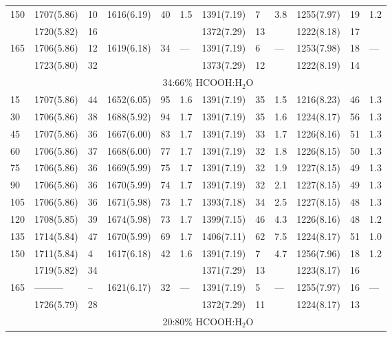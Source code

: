 \documentclass{aa}
\begin{document}
\begin{appendix}
\begin{table*}
\begin{center}
\begin{tabular}{l|lllll|lll|lll}
150          & 1707(5.86) & 10 & 1616(6.19) & 40 & 1.5 & 1391(7.19) &  7 & 3.8 & 1255(7.97) & 19 & 1.2\\ 
             & 1720(5.82) & 16 &            &    &     & 1372(7.29) & 13 &     & 1222(8.18) & 17 &    \\ 
165          & 1706(5.86) & 12 & 1619(6.18) & 34 & --- & 1391(7.19) &  6 & --- & 1253(7.98) & 18 & ---\\
             & 1723(5.80) & 32 &            &    &     & 1373(7.29) & 12 &     & 1222(8.19) & 14 &    \\ 
\hline
 & \multicolumn{11}{c}{34:66\% HCOOH:H$_2$O}\\
\hline
15           & 1707(5.86) & 44 & 1652(6.05) & 95 & 1.6 & 1391(7.19) & 35 & 1.5 & 1216(8.23) & 46 & 1.3\\ 
30           & 1706(5.86) & 38 & 1688(5.92) & 94 & 1.7 & 1391(7.19) & 35 & 1.6 & 1224(8.17) & 56 & 1.3\\ 
45           & 1707(5.86) & 36 & 1667(6.00) & 83 & 1.7 & 1391(7.19) & 33 & 1.7 & 1226(8.16) & 51 & 1.3\\ 
60           & 1706(5.86) & 37 & 1668(6.00) & 77 & 1.7 & 1391(7.19) & 32 & 1.8 & 1226(8.15) & 50 & 1.3\\ 
75           & 1706(5.86) & 36 & 1669(5.99) & 75 & 1.7 & 1391(7.19) & 32 & 1.9 & 1227(8.15) & 49 & 1.3\\ 
90           & 1706(5.86) & 36 & 1670(5.99) & 74 & 1.7 & 1391(7.19) & 32 & 2.1 & 1227(8.15) & 49 & 1.3\\ 
105          & 1706(5.86) & 36 & 1671(5.98) & 73 & 1.7 & 1393(7.18) & 34 & 2.5 & 1227(8.15) & 48 & 1.3\\ 
120          & 1708(5.85) & 39 & 1674(5.98) & 73 & 1.7 & 1399(7.15) & 46 & 4.3 & 1226(8.16) & 48 & 1.2\\ 
135          & 1714(5.84) & 47 & 1670(5.99) & 69 & 1.7 & 1406(7.11) & 62 & 7.5 & 1224(8.17) & 51 & 1.0\\ 
150          & 1711(5.84) &  4 & 1617(6.18) & 42 & 1.6 & 1391(7.19) &  7 & 4.7 & 1256(7.96) & 18 & 1.2\\ 
             & 1719(5.82) & 34 &            &    &     & 1371(7.29) & 13 &     & 1223(8.17) & 16 &    \\ 
165          & ---------  & -- & 1621(6.17) & 32 & --- & 1391(7.19) &  5 & --- & 1255(7.97) & 16 & ---\\
             & 1726(5.79) & 28 &            &    &     & 1372(7.29) & 11 &     & 1224(8.17) & 13 &    \\
\hline
 & \multicolumn{11}{c}{20:80\% HCOOH:H$_2$O}\\

\end{tabular}
\end{center}
\end{table*}
\end{appendix}
\end{document}
